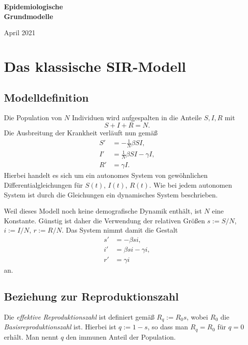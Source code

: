 \documentclass[a4paper,10pt,fleqn,twocolumn,twoside,dvipdfmx]{scrartcl}
\numberwithin{equation}{section}
\begin{document}

\noindent
{\huge\textbf{Epidemiologische\\
Grundmodelle}\par}

\vspace{1em}\noindent
{\large April 2021}

\vspace{-0.5em}
\tableofcontents

\vspace{-0.5em}
\section{Das klassische SIR-Modell}
\subsection{Modelldefinition}

Die Population von $N$ Individuen wird aufgespalten in die Anteile
$S,I,R$ mit%
\begin{equation}
S+I+R=N.
\end{equation}
Die Ausbreitung der Krankheit verläuft nun gemäß%
\begin{align}
S' &= -\tfrac{1}{N} \beta SI,\\
I' &= \tfrac{1}{N} \beta SI - \gamma I,\\
R' &= \gamma I.
\end{align}
Hierbei handelt es sich um ein autonomes System von gewöhnlichen
Differentialgleichungen für $S(t)$, $I(t)$, $R(t)$.
Wie bei jedem autonomen System ist durch die Gleichungen ein
dynamisches System beschrieben.

Weil dieses Modell noch keine demografische Dynamik enthält,
ist $N$ eine Konstante. Günstig ist daher die Verwendung der
relativen Größen $s:=S/N$, $i:=I/N$, $r:=R/N$. Das System nimmt
damit die Gestalt%
\begin{align}
\label{eq:sir-s} s' &= -\beta si,\\
\label{eq:sir-i} i' &= \beta si - \gamma i,\\
\label{eq:sir-r} r' &= \gamma i
\end{align}
an.

\subsection{Beziehung zur Reproduktionszahl}

Die \emph{effektive Reproduktionszahl} ist definiert gemäß
$R_q := R_0 s$, wobei $R_0$ die \emph{Basisreproduktionszahl} ist.
Hierbei ist $q:=1-s$, so dass man $R_q=R_0$ für $q=0$ erhält. Man nennt
$q$ den immunen Anteil der Population.
\end{document}
